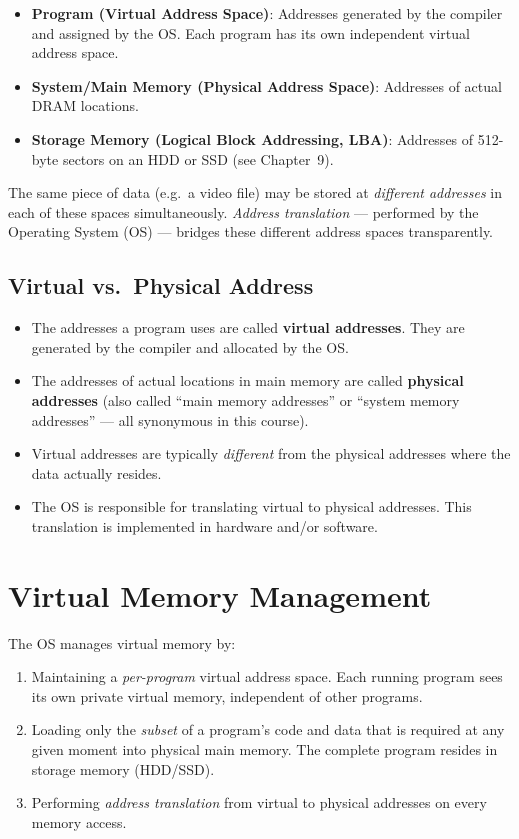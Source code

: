 \documentclass[11pt, a4paper, notitlepage]{report}
\theoremstyle{definition}
\theoremstyle{remark}
\theoremstyle{definition}
\begin{document}
\begin{itemize}
  \item \textbf{Program (Virtual Address Space)}: Addresses generated by the compiler and assigned by the OS. Each program has its own independent virtual address space.
  \item \textbf{System/Main Memory (Physical Address Space)}: Addresses of actual DRAM locations.
  \item \textbf{Storage Memory (Logical Block Addressing, LBA)}: Addresses of 512-byte sectors on an HDD or SSD (see Chapter~9).
\end{itemize}

The same piece of data (e.g.\ a video file) may be stored at \emph{different addresses} in each of these spaces simultaneously. \emph{Address translation} — performed by the Operating System (OS) — bridges these different address spaces transparently.

\subsection{Virtual vs.\ Physical Address}
\label{sec:virtual-vs-physical}

\begin{itemize}
  \item The addresses a program uses are called \textbf{virtual addresses}. They are generated by the compiler and allocated by the OS.
  \item The addresses of actual locations in main memory are called \textbf{physical addresses} (also called ``main memory addresses'' or ``system memory addresses'' — all synonymous in this course).
  \item Virtual addresses are typically \emph{different} from the physical addresses where the data actually resides.
  \item The OS is responsible for translating virtual to physical addresses. This translation is implemented in hardware and/or software.
\end{itemize}

\section{Virtual Memory Management}
\label{sec:vmm}

The OS manages virtual memory by:
\begin{enumerate}
  \item Maintaining a \emph{per-program} virtual address space. Each running program sees its own private virtual memory, independent of other programs.
  \item Loading only the \emph{subset} of a program's code and data that is required at any given moment into physical main memory. The complete program resides in storage memory (HDD/SSD).
  \item Performing \emph{address translation} from virtual to physical addresses on every memory access.
\end{enumerate}
\end{document}
